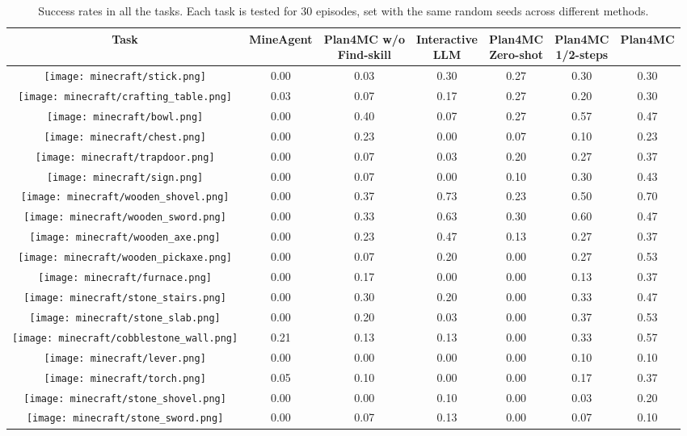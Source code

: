\documentclass{article}
\newcommand{\mcbowl}{\texttt{[image: minecraft/bowl.png]}}
\newcommand{\mcchest}{\texttt{[image: minecraft/chest.png]}}
\newcommand{\mccobblestonewall}{\texttt{[image: minecraft/cobblestone\_wall.png]}}
\newcommand{\mccraftingtable}{\texttt{[image: minecraft/crafting\_table.png]}}
\newcommand{\mcfurnace}{\texttt{[image: minecraft/furnace.png]}}
\newcommand{\mclever}{\texttt{[image: minecraft/lever.png]}}
\newcommand{\mcsign}{\texttt{[image: minecraft/sign.png]}}
\newcommand{\mcstick}{\texttt{[image: minecraft/stick.png]}}
\newcommand{\mcstonestairs}{\texttt{[image: minecraft/stone\_stairs.png]}}
\newcommand{\mcstoneslab}{\texttt{[image: minecraft/stone\_slab.png]}}
\newcommand{\mctorch}{\texttt{[image: minecraft/torch.png]}}
\newcommand{\mctrapdoor}{\texttt{[image: minecraft/trapdoor.png]}}
\newcommand{\mcwoodenpickaxe}{\texttt{[image: minecraft/wooden\_pickaxe.png]}}
\newcommand{\mcstoneshovel}{\texttt{[image: minecraft/stone\_shovel.png]}}
\newcommand{\mcstonesword}{\texttt{[image: minecraft/stone\_sword.png]}}
\newcommand{\mcwoodenaxe}{\texttt{[image: minecraft/wooden\_axe.png]}}
\newcommand{\mcwoodenshovel}{\texttt{[image: minecraft/wooden\_shovel.png]}}
\newcommand{\mcwoodensword}{\texttt{[image: minecraft/wooden\_sword.png]}}
\begin{document}
\label{appendix:results-all}
\begin{table}[htbp]
  \caption{Success rates in all the tasks. Each task is tested for 30 episodes, set with the same random seeds across different methods.}
  \label{tab:results-all-tasks}
  \centering
  \begin{tabular}{ccccccc}
    \toprule
    Task  & MineAgent & \makecell{Plan4MC w/o\\ Find-skill} & \makecell{Interactive\\ LLM} & \makecell{Plan4MC\\ Zero-shot} & \makecell{Plan4MC\\ 1/2-steps} & Plan4MC \\
    \midrule
    \mcstick  &  0.00 & 0.03 & 0.30 & 0.27 & 0.30 & 0.30  \\
    \mccraftingtable   & 0.03 & 0.07 & 0.17 & 0.27 & 0.20 & 0.30 \\
    \mcbowl  &  0.00 & 0.40 & 0.07 & 0.27 & 0.57 & 0.47 \\
    \mcchest   & 0.00  & 0.23 & 0.00 & 0.07 & 0.10 & 0.23 \\
    \mctrapdoor  & 0.00  & 0.07 & 0.03 & 0.20 & 0.27 & 0.37 \\
    \mcsign  &  0.00 & 0.07 & 0.00 & 0.10 & 0.30 & 0.43 \\
    \mcwoodenshovel & 0.00 & 0.37 & 0.73 & 0.23 & 0.50 & 0.70 \\
    \mcwoodensword & 0.00 & 0.33 & 0.63 & 0.30 & 0.60 & 0.47 \\
    \mcwoodenaxe & 0.00 & 0.23 & 0.47 & 0.13 & 0.27 & 0.37 \\
    \mcwoodenpickaxe  & 0.00 & 0.07 & 0.20 & 0.00 & 0.27 & 0.53 \\
    \midrule
    \mcfurnace  &  0.00 & 0.17 & 0.00 & 0.00 & 0.13 & 0.37 \\
    \mcstonestairs  & 0.00  & 0.30 & 0.20 & 0.00 & 0.33 & 0.47 \\
    \mcstoneslab  & 0.00  & 0.20 & 0.03 & 0.00 & 0.37 & 0.53 \\
    \mccobblestonewall  & 0.21 & 0.13 & 0.13 & 0.00 & 0.33 & 0.57 \\
    \mclever  &  0.00 & 0.00 & 0.00 & 0.00 & 0.10 & 0.10 \\
    \mctorch  & 0.05 & 0.10 & 0.00 & 0.00 & 0.17 & 0.37 \\
    \mcstoneshovel & 0.00 & 0.00 & 0.10 & 0.00 & 0.03 & 0.20 \\
    \mcstonesword & 0.00 & 0.07 & 0.13 & 0.00 & 0.07 & 0.10 \\

\end{tabular}
\end{table}
\end{document}

